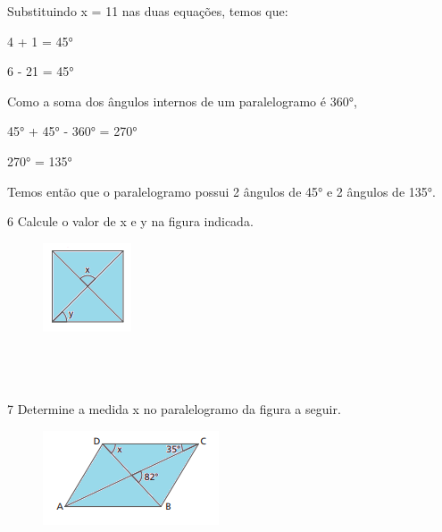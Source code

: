Substituindo x = 11 nas duas equações, temos que:

4  + 1 = 45°

6  - 21 = 45°

Como a soma dos ângulos internos de um paralelogramo é 360°,

45° + 45° - 360° = 270°

270°  = 135°

Temos então que o paralelogramo possui 2 ângulos de 45° e 2 ângulos de
135°.

\num{6} Calcule o valor de x e y na figura indicada.

\begin{figure}[H]
\centering\includegraphics[width=1.03125in,height=1.03125in]{./imgSAEB_8_MAT/media/image10.png}
\end{figure}

\\
\\
\\

\num{7} Determine a medida x no paralelogramo da figura a seguir.

\begin{figure}[H]
\centering\includegraphics[width=2.05208in,height=1.09375in]{./imgSAEB_8_MAT/media/image11.png}
\end{figure}

\\
\\
\\
\\

